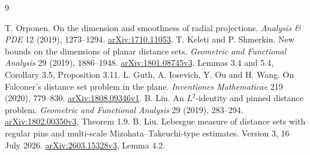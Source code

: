 \documentclass[11pt]{article}
\theoremstyle{definition}\newtheorem{remark}[theorem]{Remark}
\begin{document}
\clearpage
\begin{thebibliography}{9}\small\raggedright
{}
 T. Orponen. On the dimension and smoothness of radial
projections. \emph{Analysis \& PDE} 12 (2019), 1273--1294.
\href{https://arxiv.org/abs/1710.11053}{arXiv:1710.11053}.
 T. Keleti and P. Shmerkin. New bounds on the dimensions of planar
distance sets. \emph{Geometric and Functional Analysis} 29 (2019), 1886--1948.
\href{https://arxiv.org/abs/1801.08745v3}{arXiv:1801.08745v3}.
Lemmas 3.4 and 5.4, Corollary 3.5, Proposition 3.11.
 L. Guth, A. Iosevich, Y. Ou and H. Wang. On Falconer's distance
set problem in the plane. \emph{Inventiones Mathematicae} 219 (2020), 779--830.
\href{https://arxiv.org/pdf/1808.09346v1}{arXiv:1808.09346v1}.
 B. Liu. An \(L^2\)-identity and pinned distance problem.
\emph{Geometric and Functional Analysis} 29 (2019), 283--294.
\href{https://arxiv.org/abs/1802.00350v3}{arXiv:1802.00350v3}, Theorem 1.9.
 B. Liu. Lebesgue measure of distance sets with regular pins
and multi-scale Mizohata--Takeuchi-type estimates. Version 3, 16 July 2026.
\href{https://arxiv.org/html/2603.15328v3}{arXiv:2603.15328v3}, Lemma 4.2.
\end{thebibliography}
\end{document}
